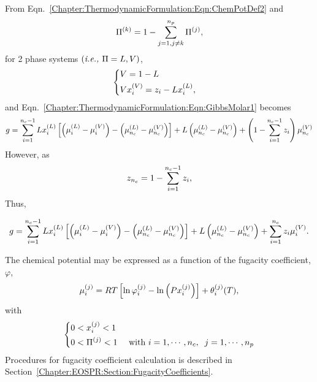 From Eqn.~\ref{Chapter:ThermodynamicFormulation:Eqn:ChemPotDef2} and
\begin{displaymath}
   \mfr[\Pi]{}{k} = 1 - \summation_{j=1,j\ne k}^{n_{p}} \mfr[\Pi]{}{j},
\end{displaymath}
for 2 phase systems $\left(\text{\ie} \Pi = L, V\right)$, 
\begin{displaymath}
  \left \{
  \begin{aligned}
    & V = 1 - L && \\
    & V\mfr[x]{i}{V} = z_{i} - L\mfr[x]{i}{L},
  \end{aligned} \right.
\end{displaymath} 
and Eqn.~\ref{Chapter:ThermodynamicFormulation:Eqn:GibbsMolar1} becomes
\begin{equation}
  g = \summation_{i=1}^{n_{c}-1} L\mfr[x]{i}{L}\left[\left(\mfr[\mu]{i}{L}-\mfr[\mu]{i}{V}\right)-\left(\mfr[\mu]{n_{c}}{L}-\mfr[\mu]{n_{c}}{V}\right)\right] + L\left(\mfr[\mu]{n_{c}}{L}-\mfr[\mu]{n_{c}}{V}\right) +  \left(1 - \summation_{i=1}^{n_{c}-1}z_{i}\right)\mfr[\mu]{n_{c}}{V}
\end{equation}
However, as
\begin{displaymath}
   z_{n_{c}} = 1 - \summation_{i=1}^{n_{c}-1}z_{i},
\end{displaymath}
Thus,
\begin{shaded}\noindent
   \begin{equation}
  g = \summation_{i=1}^{n_{c}-1} L\mfr[x]{i}{L}\left[\left(\mfr[\mu]{i}{L}-\mfr[\mu]{i}{V}\right)-\left(\mfr[\mu]{n_{c}}{L}-\mfr[\mu]{n_{c}}{V}\right)\right] + L\left(\mfr[\mu]{n_{c}}{L}-\mfr[\mu]{n_{c}}{V}\right) + \summation_{i=1}^{n_{c}}z_{i}\mfr[\mu]{i}{V}.\label{Chapter:ThermodynamicFormulation:Eqn:GibbsMolarFinal}
   \end{equation}
\end{shaded}

The chemical potential may be expressed as a function of the fugacity coefficient, $\varphi$,
\begin{equation}
   \mfr[\mu]{i}{j} = RT\left[\ln{\mfr[\varphi]{i}{j}}-\ln{\left(P\mfr[x]{i}{j}\right)}\right] + \mfr[\theta]{i}{j}(T),
\end{equation}
with
\begin{displaymath}
  \left \{
  \begin{aligned}
    & 0 < \mfr[x]{i}{j} < 1 &&  \\
    & 0 < \mfr[\Pi]{}{j} < 1 && \text{ with }  i = 1, \cdots, n_{c},\;\; j = 1, \cdots, n_{p}
  \end{aligned} \right.
\end{displaymath} 
Procedures for fugacity coefficient calculation is described in Section~\ref{Chapter:EOSPR:Section:FugacityCoefficients}.


